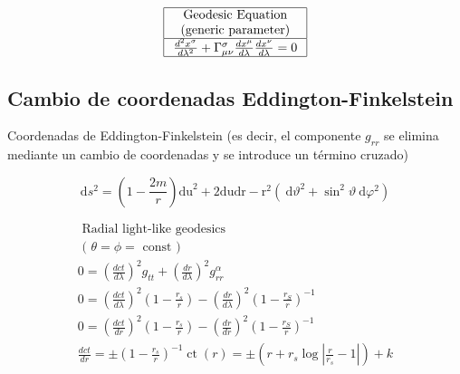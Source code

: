 \begin{equation}
    \begin{array}{|c|}
        \hline \begin{array}{c}
                   \text { Geodesic Equation } \\
                   \text { (generic parameter) }
               \end{array}                                                                                   \\
        \hline \frac{d^2 x^\sigma}{d \lambda^2}+\Gamma_{\mu \nu}^\sigma \frac{d x^\mu}{d \lambda} \frac{d x^\nu}{d \lambda}=0 \\
        \hline
    \end{array}
\end{equation}



\subsection{Cambio de coordenadas Eddington-Finkelstein}
Coordenadas de Eddington-Finkelstein (es decir, el componente $g_{r r}$ se elimina mediante un cambio de coordenadas y se introduce un término cruzado)

$$
    \mathrm{d} s^2=\left(1-\frac{2 m}{r}\right) \mathrm{du}^2+2 \mathrm{dudr}-\mathrm{r}^2\left(\mathrm{~d} \vartheta^2+\sin ^2 \vartheta \mathrm{~d} \varphi^2\right)
$$

\begin{equation}
    \begin{array}{l}
        \text { Radial light-like geodesics }                                                                                                      \\
        \text { ( } \theta=\phi=\text { const })                                                                                                   \\
        0=\left(\frac{d c t}{d \lambda}\right)^2 g_{t t}+\left(\frac{d r}{d \lambda}\right)^2 g_{r r}^\alpha                                       \\
        0=\left(\frac{d c t}{d \lambda}\right)^2\left(1-\frac{r_s}{r}\right)-\left(\frac{d r}{d \lambda}\right)^2\left(1-\frac{r_S}{r}\right)^{-1} \\
        0=\left(\frac{d c t}{d r}\right)^2\left(1-\frac{r_s}{r}\right)-\left(\frac{d r}{d r}\right)^2\left(1-\frac{r_S}{r}\right)^{-1}             \\
        \frac{d c t}{d r}= \pm\left(1-\frac{r_s}{r}\right)^{-1} \operatorname{ct}(r)= \pm\left(r+r_s \log \left|\frac{r}{r_s}-1\right|\right)+k
    \end{array}
\end{equation}

